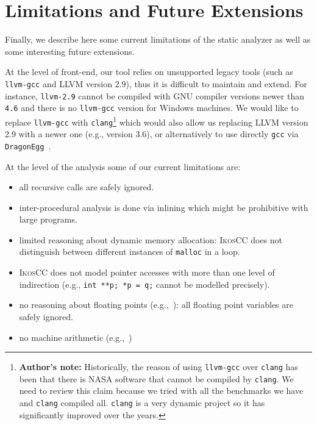 \documentclass[a4]{article}
\newcommand{\ikoscc}{\textsc{IkosCC}\xspace}
\begin{document}
\section{Limitations and Future Extensions}
\label{sec:future}

Finally, we describe here some current limitations of the static
analyzer as well as some interesting future extensions.

At the level of front-end, our tool relies on unsupported legacy tools
(such as \texttt{llvm-gcc} and LLVM version 2.9), thus it is difficult
to maintain and extend. For instance, \texttt{llvm-2.9} cannot be
compiled with GNU compiler versions newer than \texttt{4.6} and there
is no \texttt{llvm-gcc} version for Windows machines. We would like to
replace \texttt{llvm-gcc} with
\texttt{clang}\footnote{\textbf{Author's note:} Historically, the
  reason of using \texttt{llvm-gcc} over \texttt{clang} has been that
  there is NASA software that cannot be compiled by \texttt{clang}. We
  need to review this claim because we tried with all the benchmarks
  we have and \texttt{clang} compiled all. \texttt{clang} is a very
  dynamic project so it has significantly improved over the years.}
which would also allow us replacing LLVM version 2.9 with a newer one
(e.g., version 3.6), or alternatively to use directly \texttt{gcc} via
\texttt{DragonEgg}~\cite{dragonegg}.

\vspace{2mm}
At the level of the analysis some of our current limitations are:

\begin{itemize}

\item all recursive calls are safely ignored.

\item inter-procedural analysis is done via inlining which might be
  prohibitive with large programs.

\item limited reasoning about dynamic memory allocation: \ikoscc does
  not distinguish between different instances of \texttt{malloc} in a
  loop. 

\item \ikoscc does not model pointer accesses with more than one level
  of indirection (e.g., \texttt{int **p; *p = q;} cannot be modelled
  precisely).

\item no reasoning about floating points (e.g.,~\cite{Mine12}): all
  floating point variables are safely ignored.

\item no machine arithmetic (e.g.,~\cite{Mine12,wrapped})

\end{itemize}
\end{document}
